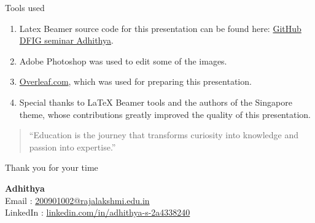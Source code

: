 \documentclass{beamer}
\begin{document}
\begin{frame}{Tools used }
    \begin{enumerate}
        \item Latex Beamer source code for this presentation can be found here: \href{https://github.com/200901002/DFIG-Seminar}{GitHub DFIG seminar Adhithya}.
        
        \item Adobe Photoshop was used to edit some of the images.

        \item \href{https://www.overleaf.com}{Overleaf.com}, which was used for preparing this presentation.
        
        \item Special thanks to LaTeX Beamer tools and the authors of the Singapore theme, whose contributions greatly improved the quality of this presentation.
    \end{enumerate}
    \vspace{0.2in}

    \begin{quote}
        \textcolor{mbrown}{``Education is the journey that transforms curiosity into knowledge and passion into expertise.''}
    \end{quote}

    \begin{center}
        {\Large{Thank you for your time }}
    \end{center}

    \begin{flushright}
        {\textbf{Adhithya}} \\
        Email : \href{mailto:200901002@rajalakshmi.edu.in}{200901002@rajalakshmi.edu.in} \\
        LinkedIn : \href{https://www.linkedin.com/in/adhithya-s-2a4338240/}{linkedin.com/in/adhithya-s-2a4338240}
    \end{flushright}
\end{frame}
\end{document}
